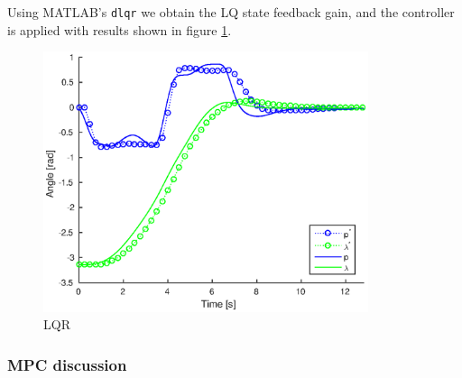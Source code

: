 Using MATLAB's \texttt{dlqr} we obtain the LQ state feedback gain, and the controller is applied with results shown in figure \ref{fig:lqr}.

\begin{figure}[hp]
	\centering
		\includegraphics[width=0.85\textwidth]{figures/3/closedloop.eps}
	\caption{LQR}
	\label{fig:lqr}
\end{figure}

\subsubsection{MPC discussion}

